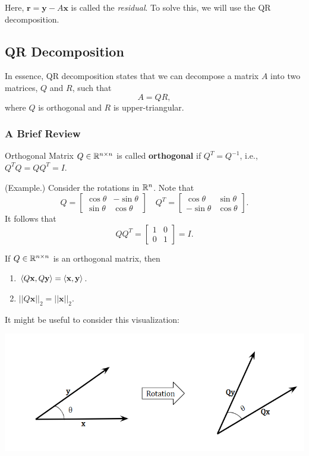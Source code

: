 \documentclass[letterpaper]{article}
\newcommand{\0}{\mathbf{0}}
\newcommand{\y}{\mathbf{y}}
\newcommand{\x}{\mathbf{x}}
\newcommand{\rr}{\mathbf{r}}
\begin{document}
Here, $\rr = \y - A\x$ is called the \emph{residual}. To solve this, we will use the QR decomposition. 

\subsection{QR Decomposition}
In essence, QR decomposition states that we can decompose a matrix $A$ into two matrices, $Q$ and $R$, such that 
\[A = QR,\]
where $Q$ is orthogonal and $R$ is upper-triangular. 

\subsubsection{A Brief Review}
\begin{definition}{Orthogonal Matrix}{}
    $Q \in \mathbb{R}^{n \times n}$ is called \textbf{orthogonal} if $Q^T = Q^{-1}$, i.e., $Q^T Q = QQ^T = I$. 
\end{definition}

\begin{mdframed}
    (Example.) Consider the rotations in $\mathbb{R}^n$. Note that 
    \[Q = \begin{bmatrix}
        \cos\theta & -\sin\theta \\ 
        \sin\theta & \cos\theta
    \end{bmatrix} \quad Q^T = \begin{bmatrix}
        \cos\theta & \sin\theta \\ 
        -\sin\theta & \cos\theta 
    \end{bmatrix}.\]
    It follows that \[QQ^T = \begin{bmatrix}
        1 & 0 \\ 0 & 1
    \end{bmatrix} = I.\]
\end{mdframed}

\begin{theorem}{}{}
    If $Q \in \mathbb{R}^{n \times n}$ is an orthogonal matrix, then 
    \begin{enumerate}
        \item $\cyclic{Q\x, Q\y} = \cyclic{\x, \y}$. 
        \item $||Q\x||_2 = ||\x||_2$.
    \end{enumerate}    
\end{theorem}
It might be useful to consider this visualization: 
\begin{center}
    \includegraphics[scale=0.8]{../assets/angle_orth.png}
\end{center}
\end{document}
